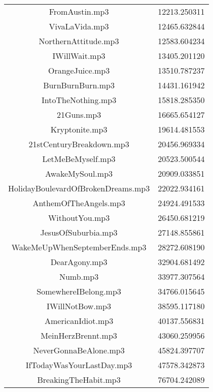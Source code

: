 \documentclass[conference]{IEEEtran}
\begin{document}
\begin{table}[htbp]
\begin{center}
\begin{tabular}{|c|c|}
      FromAustin.mp3 & 12213.250311 \\
      VivaLaVida.mp3 & 12465.632844 \\
      NorthernAttitude.mp3 & 12583.604234 \\
      IWillWait.mp3 & 13405.201120 \\
      OrangeJuice.mp3 & 13510.787237 \\
      BurnBurnBurn.mp3 & 14431.161942 \\
      IntoTheNothing.mp3 & 15818.285350 \\
      21Guns.mp3 & 16665.654127 \\
      Kryptonite.mp3 & 19614.481553 \\
      21stCenturyBreakdown.mp3 & 20456.969334 \\
      LetMeBeMyself.mp3 & 20523.500544 \\
      AwakeMySoul.mp3 & 20909.033851 \\
      HolidayBoulevardOfBrokenDreams.mp3 & 22022.934161 \\
      AnthemOfTheAngels.mp3 & 24924.491533 \\
      WithoutYou.mp3 & 26450.681219 \\
      JesusOfSuburbia.mp3 & 27148.855861 \\
      WakeMeUpWhenSeptemberEnds.mp3 & 28272.608190 \\
      DearAgony.mp3 & 32904.681492 \\
      Numb.mp3 & 33977.307564 \\
      SomewhereIBelong.mp3 & 34766.015645 \\
      IWillNotBow.mp3 & 38595.117180 \\
      AmericanIdiot.mp3 & 40137.556831 \\ 
      MeinHerzBrennt.mp3 & 43060.259956 \\
      NeverGonnaBeAlone.mp3 & 45824.397707 \\
      IfTodayWasYourLastDay.mp3 & 47578.342873 \\
      BreakingTheHabit.mp3 & 76704.242089 \\
      \hline
    \end{tabular}
  \end{center}
\end{table}
\end{document}
